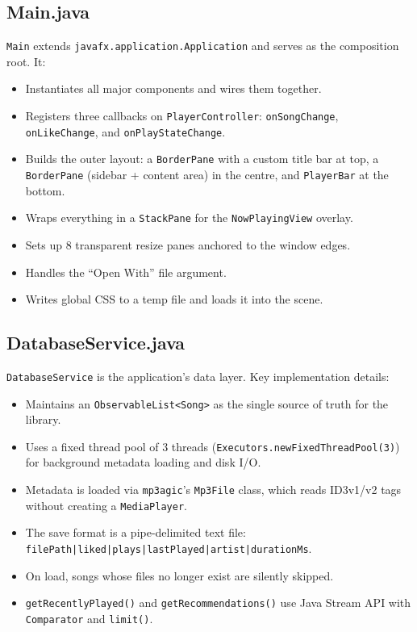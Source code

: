 ﻿\documentclass[12pt]{report}
\begin{document}
\subsection{Main.java}
\texttt{Main} extends \texttt{javafx.application.Application} and serves as the composition root. It:
\begin{itemize}
    \item Instantiates all major components and wires them together.
    \item Registers three callbacks on \texttt{PlayerController}: \texttt{onSongChange}, \texttt{onLikeChange}, and \texttt{onPlayStateChange}.
    \item Builds the outer layout: a \texttt{BorderPane} with a custom title bar at top, a \texttt{BorderPane} (sidebar + content area) in the centre, and \texttt{PlayerBar} at the bottom.
    \item Wraps everything in a \texttt{StackPane} for the \texttt{NowPlayingView} overlay.
    \item Sets up 8 transparent resize panes anchored to the window edges.
    \item Handles the ``Open With'' file argument.
    \item Writes global CSS to a temp file and loads it into the scene.
\end{itemize}

\subsection{DatabaseService.java}
\texttt{DatabaseService} is the application's data layer. Key implementation details:
\begin{itemize}
    \item Maintains an \texttt{ObservableList<Song>} as the single source of truth for the library.
    \item Uses a fixed thread pool of 3 threads (\texttt{Executors.newFixedThreadPool(3)}) for background metadata loading and disk I/O.
    \item Metadata is loaded via \texttt{mp3agic}'s \texttt{Mp3File} class, which reads ID3v1/v2 tags without creating a \texttt{MediaPlayer}.
    \item The save format is a pipe-delimited text file: \texttt{filePath|liked|plays|lastPlayed|artist|durationMs}.
    \item On load, songs whose files no longer exist are silently skipped.
    \item \texttt{getRecentlyPlayed()} and \texttt{getRecommendations()} use Java Stream API with \texttt{Comparator} and \texttt{limit()}.
\end{itemize}
\end{document}
